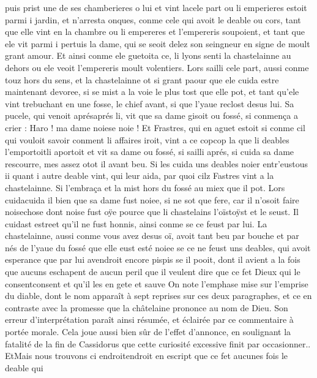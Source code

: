 \documentclass{article}
\begin{document}
\begin{pages}
   puis prist une de ses chamberieres o lui et vint 
   lacele part ou 
   li emperieres estoit parmi i jardin, et n’arresta onques, 
   conme cele qui avoit le deable ou cors, tant que elle vint en la chambre ou li empereres 
   et l’empereris soupoient, et tant que ele vit parmi i pertuis 
   la dame, qui se seoit delez son seingneur 
   en signe de moult grant amour. Et ainsi conme ele guetoita ce, 
   li lyons senti 
   la chastelainne au dehors ou ele veoit l’empereris 
   moult volentiers. Lors sailli cele part, aussi conme touz hors du sens, et la chastelainne 
   ot si grant paour que ele cuida estre maintenant devoree, si se mist a la voie le plus tost que elle pot, 
   et tant qu’ele vint trebuchant en une fosse, le chief avant, si que l’yaue reclost desus lui. 
   Sa pucele, qui venoit 
   aprésaprés li, vit que 
   sa dame gisoit ou fossé, si conmença a crier :
   Haro ! ma dame noiese noie !
   Et Frastres, qui en aguet estoit si conme cil qui vouloit savoir conment li affaires iroit, 
   vint a ce copcop la que li deables 
   l’emportoitli aportoit et vit 
   sa dame ou fossé, si sailli aprés, 
   si cuida sa dame rescourre, mes assez 
   otot il avant beu. 
   Si les cuida uns deables noier 
   entr’eustous 
   ii quant i autre deable vint, qui leur aida, par quoi
   cilz Fastres vint a la chastelainne. Si l’embraça et 
   la mist hors du fossé au miex que il pot. 
   Lors cuidacuida il bien que sa dame 
   fust noiee, si ne sot que fere, car il n’osoit faire 
   noisechose dont noise fust oÿe pource que 
   li chastelains l’oïstoÿst et le seust. 
   Il cuidast estreet qu'il ne fust honnis, ainsi conme se ce feust par lui. \pend
\pstart La chastelainne, 
   aussi conme vous avez desus oï, avoit tant beu par bouche et par nés 
   de l’yaue 
   du fossé que elle eust esté noiee 
   se ce ne feust uns deables, qui avoit esperance que par lui avendroit encore 
   pispis se il pooit, 
   dont il avient a la fois que aucuns eschapent de aucun peril que il veulent dire que ce fet Dieux qui le 
   consentconsent et qu'il les en gete et sauve
   On note l'emphase mise sur l'emprise du diable, dont le nom apparaît à sept reprises sur ces deux paragraphes, 
      et ce en contraste avec la promesse que la châtelaine prononce au nom de Dieu. Son erreur d'interprétation paraît ainsi résumée,
      et éclairée par ce commentaire à portée morale. Cela joue aussi bien sûr de l'effet d'annonce, en soulignant la fatalité de la fin 
      de Cassidorus que cette curiosité excessive finit par occasionner.. 
   EtMais nous trouvons ci 
      endroitendroit en escript que ce fet aucunes fois le deable qui 

\end{pages}
\end{document}
